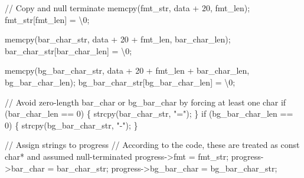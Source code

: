 \documentclass[
  a4paper,
]{scrreprt}
\newenvironment{Shaded}{\begin{snugshade}}{\end{snugshade}}
\newcommand{\CharTok}[1]{\textcolor[rgb]{0.00,0.50,0.00}{#1}}
\newcommand{\CommentTok}[1]{\textcolor[rgb]{0.41,0.41,0.41}{#1}}
\newcommand{\ControlFlowTok}[1]{\textcolor[rgb]{0.85,0.12,0.09}{#1}}
\newcommand{\DecValTok}[1]{\textcolor[rgb]{0.47,0.16,0.63}{#1}}
\newcommand{\NormalTok}[1]{\textcolor[rgb]{0.33,0.33,0.33}{#1}}
\newcommand{\OperatorTok}[1]{\textcolor[rgb]{0.00,0.46,0.62}{#1}}
\newcommand{\SpecialCharTok}[1]{\textcolor[rgb]{0.00,0.46,0.62}{#1}}
\newcommand{\StringTok}[1]{\textcolor[rgb]{0.00,0.50,0.00}{#1}}
\theoremstyle{definition}
\theoremstyle{remark}
\begin{document}
\begin{Shaded}
\begin{Highlighting}[numbers=left,,]
    \CommentTok{// Copy and null terminate}
\NormalTok{    memcpy}\OperatorTok{(}\NormalTok{fmt\_str}\OperatorTok{,}\NormalTok{ data }\OperatorTok{+} \DecValTok{20}\OperatorTok{,}\NormalTok{ fmt\_len}\OperatorTok{);}
\NormalTok{    fmt\_str}\OperatorTok{[}\NormalTok{fmt\_len}\OperatorTok{]} \OperatorTok{=} \CharTok{\textquotesingle{}}\SpecialCharTok{\textbackslash{}0}\CharTok{\textquotesingle{}}\OperatorTok{;}

\NormalTok{    memcpy}\OperatorTok{(}\NormalTok{bar\_char\_str}\OperatorTok{,}\NormalTok{ data }\OperatorTok{+} \DecValTok{20} \OperatorTok{+}\NormalTok{ fmt\_len}\OperatorTok{,}\NormalTok{ bar\_char\_len}\OperatorTok{);}
\NormalTok{    bar\_char\_str}\OperatorTok{[}\NormalTok{bar\_char\_len}\OperatorTok{]} \OperatorTok{=} \CharTok{\textquotesingle{}}\SpecialCharTok{\textbackslash{}0}\CharTok{\textquotesingle{}}\OperatorTok{;}

\NormalTok{    memcpy}\OperatorTok{(}\NormalTok{bg\_bar\_char\_str}\OperatorTok{,}\NormalTok{ data }\OperatorTok{+} \DecValTok{20} \OperatorTok{+}\NormalTok{ fmt\_len }\OperatorTok{+}\NormalTok{ bar\_char\_len}\OperatorTok{,}\NormalTok{ bg\_bar\_char\_len}\OperatorTok{);}
\NormalTok{    bg\_bar\_char\_str}\OperatorTok{[}\NormalTok{bg\_bar\_char\_len}\OperatorTok{]} \OperatorTok{=} \CharTok{\textquotesingle{}}\SpecialCharTok{\textbackslash{}0}\CharTok{\textquotesingle{}}\OperatorTok{;}

    \CommentTok{// Avoid zero{-}length bar\_char or bg\_bar\_char by forcing at least one char}
    \ControlFlowTok{if} \OperatorTok{(}\NormalTok{bar\_char\_len }\OperatorTok{==} \DecValTok{0}\OperatorTok{)} \OperatorTok{\{}
\NormalTok{      strcpy}\OperatorTok{(}\NormalTok{bar\_char\_str}\OperatorTok{,} \StringTok{"="}\OperatorTok{);}
    \OperatorTok{\}}
    \ControlFlowTok{if} \OperatorTok{(}\NormalTok{bg\_bar\_char\_len }\OperatorTok{==} \DecValTok{0}\OperatorTok{)} \OperatorTok{\{}
\NormalTok{      strcpy}\OperatorTok{(}\NormalTok{bg\_bar\_char\_str}\OperatorTok{,} \StringTok{"{-}"}\OperatorTok{);}
    \OperatorTok{\}}

    \CommentTok{// Assign strings to progress}
    \CommentTok{// According to the code, these are treated as const char* and assumed null{-}terminated}
\NormalTok{    progress}\OperatorTok{{-}\textgreater{}}\NormalTok{fmt }\OperatorTok{=}\NormalTok{ fmt\_str}\OperatorTok{;}
\NormalTok{    progress}\OperatorTok{{-}\textgreater{}}\NormalTok{bar\_char }\OperatorTok{=}\NormalTok{ bar\_char\_str}\OperatorTok{;}
\NormalTok{    progress}\OperatorTok{{-}\textgreater{}}\NormalTok{bg\_bar\_char }\OperatorTok{=}\NormalTok{ bg\_bar\_char\_str}\OperatorTok{;}


\end{Highlighting}
\end{Shaded}
\end{document}
